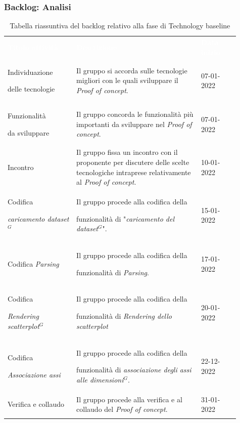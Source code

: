 \subsubsection{Backlog: Analisi}
{\renewcommand{\arraystretch}{1.5}
\begin{longtable}{p{0.27\linewidth}p{0.49\linewidth}p{0.15\linewidth}}
	\rowcolor[RGB]{33, 73, 50}
	\textcolor{white}{\textbf{Titolo attività}} & \textcolor{white}{\textbf{Descrizione}} & \textcolor{white}{\textbf{Data inizio}}\\
    
    \rowcolor[RGB]{216, 235, 171}
    Individuazione \par delle tecnologie & Il gruppo si accorda sulle tecnologie migliori con le quali sviluppare il \textit{Proof of concept}. & 07-01-2022\\

    \rowcolor[RGB]{233, 245, 206}
    Funzionalità \par da sviluppare & Il gruppo concorda le funzionalità più importanti da sviluppare nel \textit{Proof of concept}. & 07-01-2022\\

    \rowcolor[RGB]{216, 235, 171}
    Incontro & Il gruppo fissa un incontro con il proponente per discutere delle scelte tecnologiche intraprese relativamente al \textit{Proof of concept}. & 10-01-2022\\

    \rowcolor[RGB]{233, 245, 206}
    Codifica \par \textit{caricamento dataset$^{G}$} & Il gruppo procede alla codifica della \par funzionalità di "\textit{caricamento del dataset$^{G}$}". & 15-01-2022\\

    \rowcolor[RGB]{216, 235, 171}
    Codifica \textit{Parsing} & Il gruppo procede alla codifica della \par funzionalità di \textit{Parsing}. & 17-01-2022\\

    \rowcolor[RGB]{233, 245, 206}
    Codifica \par \textit{Rendering scatterplot$^{G}$} & Il gruppo procede alla codifica della \par funzionalità di \textit{Rendering dello scatterplot} & 20-01-2022\\

    \rowcolor[RGB]{216, 235, 171}
    Codifica \par \textit{Associazione assi} & Il gruppo procede alla codifica della \par funzionalità di \textit{associazione degli assi alle dimensioni$^{G}$}. & 22-12-2022\\

    \rowcolor[RGB]{233, 245, 206}
    Verifica e collaudo & Il gruppo procede alla verifica e al collaudo del \textit{Proof of concept}. & 31-01-2022\\

    \caption{Tabella riassuntiva del backlog relativo alla fase di Technology baseline}
\end{longtable}	
}

